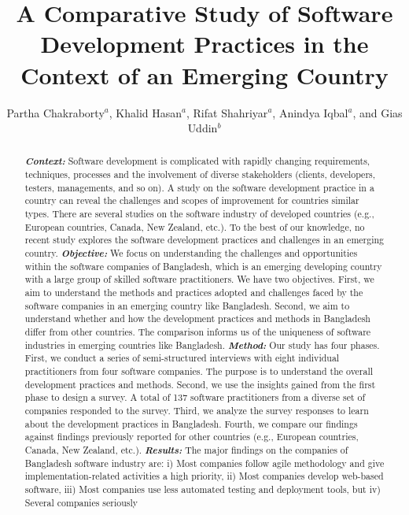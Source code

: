 \documentclass[review]{elsarticle}
\title{A Comparative Study of Software Development Practices in the Context of an Emerging Country}
\def\it{\textit}
\newcounter{finding_counter}
\begin{document}
\begin{frontmatter}



\author{Partha Chakraborty$^a$, Khalid Hasan$^a$, Rifat Shahriyar$^a$, Anindya Iqbal$^a$, and Gias Uddin$^b$}
\address{$^a$Bangladesh University of Engineering and Technology and $^b$University of Calgary}
\begin{abstract}\textbf{\it{Context:}}
Software development is complicated with rapidly changing requirements, techniques, processes and 
the involvement of diverse stakeholders (clients, developers, testers, managements, and so on). 
A study on the software development practice in a country
can reveal the challenges and scopes of improvement for countries similar types. There are several studies on the software industry
of developed countries (e.g., European countries, Canada, 
New Zealand, etc.). To the best of our knowledge, no recent study explores the software development practices and challenges
in an emerging country. 
\textbf{\it{Objective:}} We focus on understanding the challenges and
opportunities within the software companies of Bangladesh, which is an emerging
developing country with a large group of skilled software practitioners. We have
two objectives. First, we aim to understand the methods and practices 
adopted and challenges faced by the software companies in an emerging
country like Bangladesh. Second, we aim  to understand whether and how the development practices
and methods in Bangladesh differ from other countries. The comparison informs us
of the uniqueness of software industries in emerging countries like Bangladesh.
\textbf{\it{Method:}} Our study has four phases. First, we conduct a series of
semi-structured interviews with eight individual practitioners from four
software companies. The purpose is to understand the overall development
practices and methods. Second, we use the insights gained from the first phase
to design a survey. A total of 137 software practitioners from a diverse set of
companies responded to the survey. Third, we analyze the survey responses to learn about the development 
practices in Bangladesh. Fourth, we compare our findings against findings previously reported for other countries (e.g., European countries, Canada, 
New Zealand, etc.).
\textbf{\it{Results:}} The major findings on the companies of
Bangladesh software industry are: i) Most companies follow agile methodology
and give implementation-related activities a high priority, ii) Most companies
develop web-based software, iii) Most companies use less
automated testing and deployment tools, but iv) Several companies seriously

\end{abstract}
\end{frontmatter}
\end{document}
